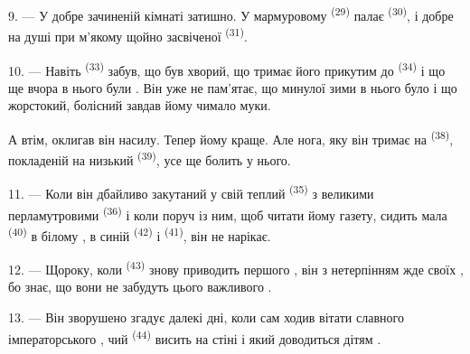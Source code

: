 9. --- У добре зачиненій кімнаті затишно. У мармуровому 
\textsuperscript{(29)} палає  \textsuperscript{(30)}, і
добре на душі при м'якому  щойно засвіченої 
\textsuperscript{(31)}.

\VUsaut{4.2mm}
\VUsaut{3.0mm}

10. --- Навіть  \textsuperscript{(33)} забув, що був хворий, що
 тримає його прикутим до 
\textsuperscript{(34)} і що ще вчора в нього були . Він уже
не пам'ятає, що минулої зими в нього було  і що
жорстокий, болісний  завдав йому чимало муки.

А втім, оклигав він насилу. Тепер йому краще. Але нога, яку він тримає на
 \textsuperscript{(38)}, покладеній на низький 
\textsuperscript{(39)}, усе ще болить у нього.

11. --- Коли він дбайливо закутаний у свій теплий 
\textsuperscript{(35)} з великими перламутровими 
\textsuperscript{(36)} і коли поруч із ним, щоб читати йому газету, сидить мала
 \textsuperscript{(40)} в білому , в синій
 \textsuperscript{(42)} і 
\textsuperscript{(41)}, він не нарікає.

12. --- Щороку, коли  \textsuperscript{(43)} знову приводить
 першого , він з нетерпінням жде своїх
, бо знає, що вони не забудуть цього важливого .

13. --- Він зворушено згадує далекі дні, коли сам ходив вітати славного
імператорського , чий  \textsuperscript{(44)}
висить на стіні і який доводиться дітям .
\VUsaut{6.0mm}
\VUfilet{22mm}
